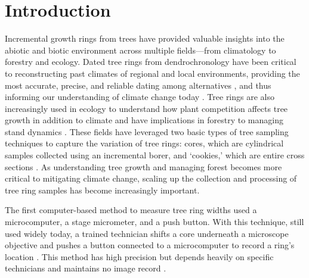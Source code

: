 \documentclass[a4paper,12pt]{article}
\begin{document}
\section{Introduction} %
Incremental growth rings from trees have provided valuable insights into the abiotic and biotic environment across multiple fields---from climatology to forestry and ecology. Dated tree rings from dendrochronology have been critical to
reconstructing past climates of regional and local environments, providing the most accurate, precise, and reliable dating among alternatives \citep{mann_northern_1999}, and thus informing  our understanding of climate change today \citep{fritts_dendroclimatology_1971,williams_using_2010,guibal_dendrochronology_2021,sheppard_dendroclimatology_2010}. Tree rings are also increasingly used in ecology to understand how plant competition affects tree growth in addition to climate \citep{buechling_climate_2017} and have implications in forestry to managing stand dynamics \citep{canham_neighborhood_2004}. These fields have leveraged two basic types of tree sampling techniques to capture the variation of tree rings: cores, which are cylindrical samples collected using an incremental borer, and `cookies,' which are entire cross sections \citep[and thus allow measuring as many radii from the sample as desired,][]{speer_fundamentals_2010}. As understanding tree growth and managing forest becomes more critical to mitigating climate change, scaling up the collection and processing of tree ring samples has become increasingly important. %

The first computer-based method to measure tree ring widths used a microcomputer, a stage micrometer, and a push button. With this technique, still used widely today, a trained technician shifts a core underneath a microscope objective and pushes a button connected to a microcomputer to record a ring's location \citep{robinson_microcomputer_1980}. %
This method has high precision but depends heavily on specific technicians and maintains no image record \citep{levanic_atrics_2007}. %
\end{document}
